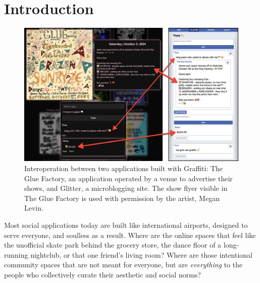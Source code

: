 \section{Introduction}

\begin{figure}[h]
    \centering
    \includegraphics[width=\textwidth]{paper/figures/gloof-and-glitter.jpg}
    \caption{
    Interoperation between two applications built with Graffiti:
    The Glue Factory, an application operated by a venue to advertise their shows,
    and Glitter, a microblogging site.
    The show flyer visible in The Glue Factory is used with permission by the artist, Megan Levin.
    }
    \label{case-studies:fig:gloof-and-glitter}
\end{figure}

Most social applications today are built like international airports,
designed to serve everyone, and soulless as a result.
Where are the online spaces that feel like
the unofficial skate park behind the grocery store,
the dance floor of a long-running nightclub,
or that one friend's living room?
Where are those intentional community spaces that
are not meant for everyone,
but are \emph{everything} to the people
who collectively curate their aesthetic and social norms?

